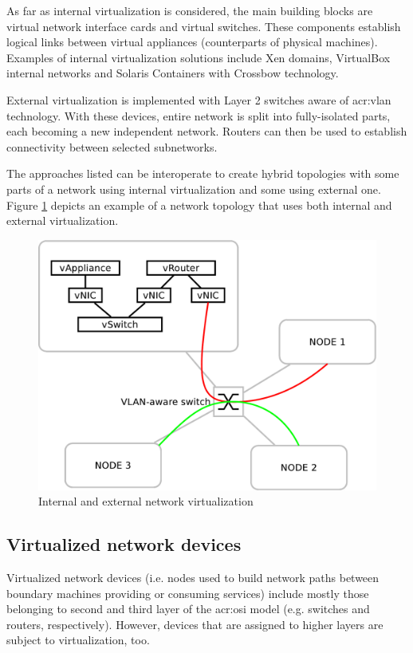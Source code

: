 \documentclass[11pt]{book}
\begin{document}
        As far as internal virtualization is considered, the main building blocks are virtual network interface cards
        and virtual switches. These components establish logical links between virtual appliances (counterparts of
        physical machines). Examples of internal virtualization solutions include Xen domains, VirtualBox internal
        networks \cite{vboxum} and Solaris Containers with Crossbow technology.

        External virtualization is implemented with Layer 2 switches aware of \gls{acr:vlan} technology. With these
        devices, entire network is split into fully-isolated parts, each becoming a new independent network. Routers can
        then be used to establish connectivity between selected subnetworks.

        The approaches listed can be interoperate to create hybrid topologies with some parts of a network using
        internal virtualization and some using external one. Figure \ref{fig:ctx:nvtypes} depicts an example of a
        network topology that uses both internal and external virtualization.
        
        \begin{figure}[H]
          \centering
          \includegraphics[width=.5\textwidth]{img/ctx/vnet-types.pdf}

          \caption{Internal and external network virtualization}
          \label{fig:ctx:nvtypes}
        \end{figure}


      \subsection{Virtualized network devices}

        Virtualized network devices (i.e. nodes used to build network paths between boundary machines providing or
        consuming services) include mostly those belonging to second and third layer of the \gls{acr:osi} model (e.g.
        switches and routers, respectively). However, devices that are assigned to higher layers are subject to
        virtualization, too.
\end{document}
